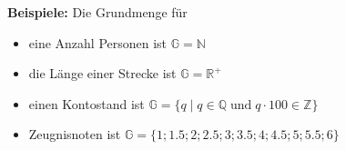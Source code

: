 \begin{example}
  \textbf{Beispiele:} Die Grundmenge für
  \begin{itemize}[noitemsep]
    \item eine Anzahl Personen ist $\mathbb{G} = \mathbb{N}$
    \item die Länge einer Strecke ist $\mathbb{G} = \mathbb{R}^{+}$
    \item einen Kontostand ist $\mathbb{G} =
    \{q \;|\; q\in \mathbb{Q} \;\text{und}\; q\cdot 100 \in \mathbb{Z}\}$
    \item Zeugnisnoten ist $\mathbb{G} = \{1;1.5;2;2.5;3;3.5;4;4.5;5;5.5;6\}$
  \end{itemize}
\end{example}
